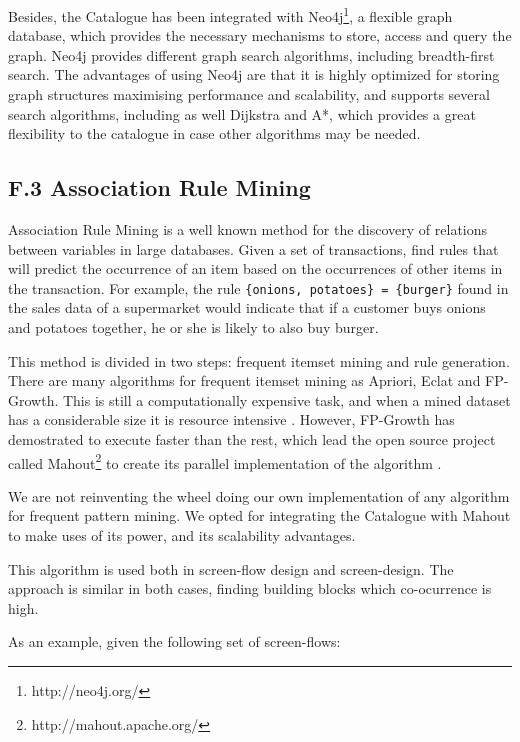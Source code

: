\documentclass{fast_latex}
\begin{document}
Besides, the Catalogue has been integrated with Neo4j\footnote{http://neo4j.org/}, a flexible graph database, which provides the necessary mechanisms to store, access and query the graph. Neo4j provides different graph search algorithms, including breadth-first search. The advantages of using Neo4j are that it is highly optimized for storing graph structures maximising performance and scalability, and supports several search algorithms, including as well Dijkstra and A*, which provides a great flexibility to the catalogue in case other algorithms may be needed.


\subsection*{F.3 Association Rule Mining}

Association Rule Mining is a well known method for the discovery of relations between variables in large databases. Given a set of transactions, find rules that will predict the occurrence of an item based on the occurrences of other items in the transaction. For example, the rule \verb|{onions, potatoes} = {burger}| found in the sales data of a supermarket would indicate that if a customer buys onions and potatoes together, he or she is likely to also buy burger. 

This method is divided in two steps: frequent itemset mining and rule generation. There are many algorithms for frequent itemset mining as Apriori, Eclat and FP-Growth. This is still a computationally expensive task, and when a mined dataset has a considerable size it is resource intensive \cite{Han:2000:MFP:335191.335372}. However, FP-Growth has demostrated to execute faster than the rest, which lead the open source project called Mahout\footnote{http://mahout.apache.org/} to create its parallel implementation of the algorithm \cite{Li:2008:PPF:1454008.1454027}.

We are not reinventing the wheel doing our own implementation of any algorithm for frequent pattern mining. We opted for integrating the Catalogue with Mahout to make uses of its power, and its scalability advantages.

This algorithm is used both in screen-flow design and screen-design. The approach is similar in both cases, finding building blocks which co-ocurrence is high.

As an example, given the following set of screen-flows:
\end{document}
